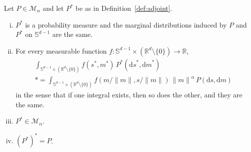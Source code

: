\documentclass{aptpubarxiv}
\numberwithin{equation}{section}
\begin{document}
\begin{lem}
\label{lem:adjoint}
Let $P \in \mathcal{M}_\alpha$ and let $P^*$ be as in Definition~\ref{def:adjoint}.
 \begin{enumerate}[(i)]
  \item $P^*$ is a probability measure and the marginal distributions induced by $P$ and $P^*$ on $\mathbb{S}^{d-1}$ are the same.
\item For every measurable function $f : \mathbb{S}^{d-1} \times ({\mathbb{R}}^d \setminus \{ 0 \}) \to {\mathbb{R}}$,
\begin{multline}
\label{eq:adjoint:f}
  \int_{ \mathbb{S}^{d-1} \times ({\mathbb{R}}^d \setminus \{ 0 \}) } f(s^*, m^*) \, P^*({\mathrm{d}s}^*, {\mathrm{d}m}^*) \\*
  = \int_{ \mathbb{S}^{d-1} \times ({\mathbb{R}}^d \setminus \{ 0 \}) } f( m / {\|{m}\|}, s / {\|{m}\|} ) \, {\|{m}\|}^\alpha \, P({\mathrm{d}s}, {\mathrm{d}m})
\end{multline}
in the sense that if one integral exists, then so does the other, and they are the same.
\item $P^* \in \mathcal{M}_\alpha$.
\item $(P^*)^* = P$.
  \end{enumerate}
\end{lem}
\end{document}
